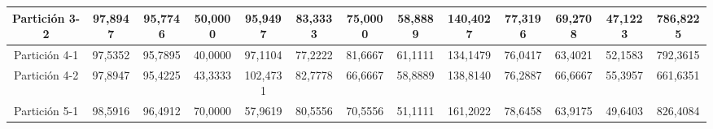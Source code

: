 \documentclass[12pt]{article}
\begin{document}
\begin{table}[H]
{\begin{tabular}{|c|cccc|cccc|cccc|}
Partición 3-2 & \multicolumn{1}{c|}{97,8947}                                                  & \multicolumn{1}{c|}{95,7746}                                                 & \multicolumn{1}{c|}{50,0000} & 95,9497  & \multicolumn{1}{c|}{83,3333}                                                  & \multicolumn{1}{c|}{75,0000}                                                 & \multicolumn{1}{c|}{58,8889} & 140,4027 & \multicolumn{1}{c|}{77,3196}                                                  & \multicolumn{1}{c|}{69,2708}                                                 & \multicolumn{1}{c|}{47,1223} & 786,8225 \\ \hline
Partición 4-1 & \multicolumn{1}{c|}{97,5352}                                                  & \multicolumn{1}{c|}{95,7895}                                                 & \multicolumn{1}{c|}{40,0000} & 97,1104  & \multicolumn{1}{c|}{77,2222}                                                  & \multicolumn{1}{c|}{81,6667}                                                 & \multicolumn{1}{c|}{61,1111} & 134,1479 & \multicolumn{1}{c|}{76,0417}                                                  & \multicolumn{1}{c|}{63,4021}                                                 & \multicolumn{1}{c|}{52,1583} & 792,3615 \\ \hline
Partición 4-2 & \multicolumn{1}{c|}{97,8947}                                                  & \multicolumn{1}{c|}{95,4225}                                                 & \multicolumn{1}{c|}{43,3333} & 102,4731 & \multicolumn{1}{c|}{82,7778}                                                  & \multicolumn{1}{c|}{66,6667}                                                 & \multicolumn{1}{c|}{58,8889} & 138,8140 & \multicolumn{1}{c|}{76,2887}                                                  & \multicolumn{1}{c|}{66,6667}                                                 & \multicolumn{1}{c|}{55,3957} & 661,6351 \\ \hline
Partición 5-1 & \multicolumn{1}{c|}{98,5916}                                                  & \multicolumn{1}{c|}{96,4912}                                                 & \multicolumn{1}{c|}{70,0000} & 57,9619  & \multicolumn{1}{c|}{80,5556}                                                  & \multicolumn{1}{c|}{70,5556}                                                 & \multicolumn{1}{c|}{51,1111} & 161,2022 & \multicolumn{1}{c|}{78,6458}                                                  & \multicolumn{1}{c|}{63,9175}                                                 & \multicolumn{1}{c|}{49,6403} & 826,4084 \\ \hline

\end{tabular}}
\end{table}
\end{document}
